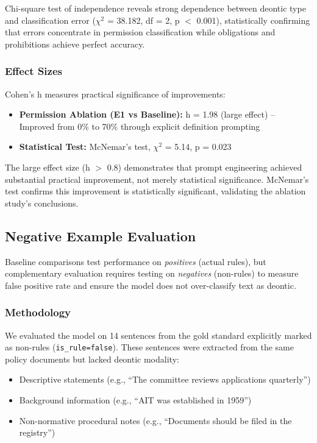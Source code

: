 Chi-square test of independence reveals strong dependence between deontic type and classification error ($\chi^2$ = 38.182, df =  2, p $<$ 0.001), statistically confirming that errors concentrate in permission classification while obligations and prohibitions achieve perfect accuracy.

\subsubsection{Effect Sizes}

Cohen's h measures practical significance of improvements:

\begin{itemize}
    \item \textbf{Permission Ablation (E1 vs Baseline):} h = 1.98 (large effect)  
        -- Improved from 0\% to 70\% through explicit definition prompting
    \item \textbf{Statistical Test:} McNemar's test, $\chi^2$ = 5.14, p = 0.023
\end{itemize}

The large effect size (h $>$ 0.8) demonstrates that prompt engineering achieved substantial practical improvement, not merely statistical significance. McNemar's test confirms this improvement is statistically significant, validating the ablation study's conclusions.

\subsection{Negative Example Evaluation}
\label{sec:negative-examples}

Baseline comparisons test performance on \textit{positives} (actual rules), but complementary evaluation requires testing on \textit{negatives} (non-rules) to measure false positive rate and ensure the model does not over-classify text as deontic.

\subsubsection{Methodology}

We evaluated the model on 14 sentences from the gold standard explicitly marked as non-rules (\texttt{is\_rule=false}). These sentences were extracted from the same policy documents but lacked deontic modality:

\begin{itemize}
    \item Descriptive statements (e.g., ``The committee reviews applications quarterly'')
    \item Background information (e.g., ``AIT was established in 1959'')
    \item Non-normative procedural notes (e.g., ``Documents should be filed in the registry'')
\end{itemize}

